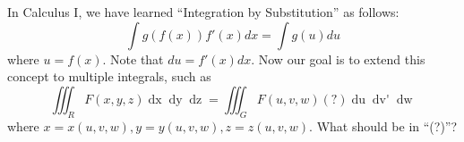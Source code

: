 \documentclass[11pt,t]{beamer}
\begin{document}
\begin{frame}
    In Calculus I, we have learned ``Integration by Substitution'' as follows:
    \[ \int g(f(x)) f'(x)dx = \int g(u)du \]
    where $u=f(x)$. Note that $du=f'(x)dx$.
    \newline
    Now our goal is to extend this concept to multiple integrals, such as
    \[ \iiint_R F(x,y,z)\mathop{dx}\mathop{dy}\mathop{dz} = \iiint_G F(u,v,w) (?)\mathop{du}\mathop{dv'}\mathop{dw} \]
    where $x=x(u,v,w), y=y(u,v,w), z=z(u,v,w)$. What should be in ``(?)''?
\end{frame}
\end{document}
